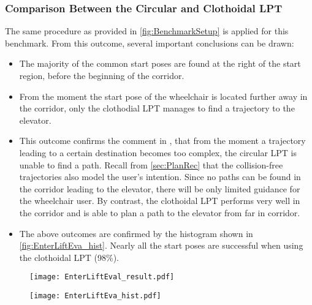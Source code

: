\subsubsection{Comparison Between the Circular and Clothoidal LPT}
The same procedure as provided in \cref{fig:BenchmarkSetup} is applied for this benchmark.  From this outcome, several important conclusions can be drawn:
\begin{itemize}
\item The majority of the common start poses are found at the right of the start region, before the beginning of the corridor. 
\item From the moment the start pose of the wheelchair is located further away in the corridor, only the clothodial LPT manages to find a trajectory to the elevator.
\item This outcome confirms the comment in \cite{VanderPoortenEtAl2012}, that from the moment a trajectory leading to a certain destination becomes too complex, the circular LPT is unable to find a path. Recall from \cref{sec:PlanRec} that the collision-free trajectories also model the user’s intention. Since no paths can be found in the corridor leading to the elevator, there will be only limited guidance for the wheelchair user. By contrast, the clothoidal LPT performs very well in the corridor and is able to plan a path to the elevator from far in corridor.
\item The above outcomes are confirmed by the histogram shown in \cref{fig:EnterLiftEva_hist}. Nearly all the start poses are successful when using the clothoidal LPT (98\%).
\end{itemize}

\begin{figure}[!htbp]
	\centering
    \texttt{[image: EnterLiftEval\_result.pdf]}
\end{figure}

\begin{figure}[!htbp]
	\centering
    \texttt{[image: EnterLiftEva\_hist.pdf]}
\end{figure}

